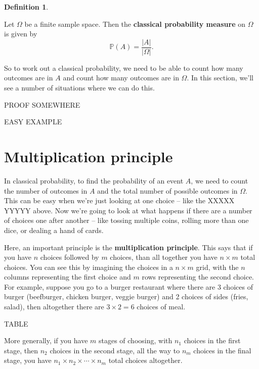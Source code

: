 \documentclass[
  a4paper,
]{book}
\theoremstyle{definition}
\newtheorem{definition}{Definition}[chapter]
\theoremstyle{definition}
\theoremstyle{definition}
\theoremstyle{remark}
\begin{document}
\begin{definition}
\protect\hypertarget{def:unlabeled-div-19}{}\label{def:unlabeled-div-19}

Let \(\Omega\) be a finite sample space. Then the \textbf{classical probability measure} on \(\Omega\) is given by
\[ \mathbb P(A) = \frac{|A|}{|\Omega|} . \]

\end{definition}

So to work out a classical probability, we need to be able to count how many outcomes are in \(A\) and count how many outcomes are in \(\Omega\). In this section, we'll see a number of situations where we can do this.

PROOF SOMEWHERE

EASY EXAMPLE

\hypertarget{multiplication}{%
\section{Multiplication principle}\label{multiplication}}

In classical probability, to find the probability of an event \(A\), we need to count the number of outcomes in \(A\) and the total number of possible outcomes in \(\Omega\). This can be easy when we're just looking at one choice -- like the XXXXX YYYYY above. Now we're going to look at what happens if there are a number of choices one after another -- like tossing multiple coins, rolling more than one dice, or dealing a hand of cards.

Here, an important principle is the \textbf{multiplication principle}. This says that if you have \(n\) choices followed by \(m\) choices, than all together you have \(n \times m\) total choices. You can see this by imagining the choices in a \(n \times m\) grid, with the \(n\) columns representing the first choice and \(m\) rows representing the second choice. For example, suppose you go to a burger restaurant where there are 3 choices of burger (beefburger, chicken burger, veggie burger) and 2 choices of sides (fries, salad), then altogether there are \(3 \times 2 = 6\) choices of meal.

TABLE

More generally, if you have \(m\) stages of choosing, with \(n_1\) choices in the first stage, then \(n_2\) choices in the second stage, all the way to \(n_m\) choices in the final stage, you have \(n_1 \times n_2 \times \cdots \times n_m\) total choices altogether.
\end{document}
